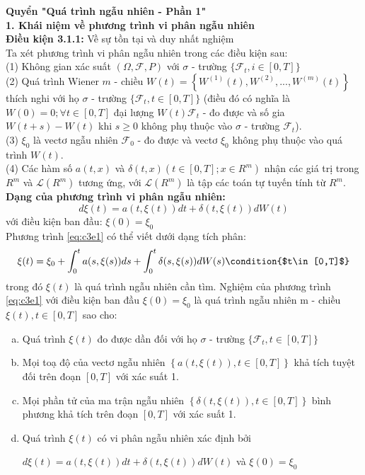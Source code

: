 \documentclass[12pt,a4paper]{article}
\begin{document}
\textbf{Quyển "Quá trình ngẫu nhiên - Phần 1"}\\
\textbf{1. Khái niệm về phương trình vi phân ngẫu nhiên}\\
\textbf{Điều kiện 3.1.1:} Về sự tồn tại và duy nhất nghiệm\\
Ta xét phương trình vi phân ngẫu nhiên trong các điều kiện sau:\\
(1) Không gian xác suất $(\Omega,\mathscr{F},P)$ với $\sigma$ - trường $\{\mathscr{F}_t,i\in [0,T]\}$\\
(2) Quá trình Wiener $m$ - chiều $W(t)=\left\{W^{(1)}(t),W^{(2)},...,W^{(m)}(t) \right\}$ thích nghi với họ $\sigma$ - trường $\{\mathscr{F}_t,t\in [0,T] \}$ (điều đó có nghĩa là $W(0)=0;\forall t\in[0,T]$ đại lượng $W(t)\mathscr{F}_t$ - đo được và số gia $W(t+s)-W(t)$ khi $s\geq0$ không phụ thuộc vào $\sigma$ - trường $\mathscr{F}_t$).\\
(3) $\xi_0$ là vectơ ngẫu nhiên $\mathscr{F}_0$ - đo được và vectơ $\xi_0$ không phụ thuộc vào quá trình $W(t)$.\\
(4) Các hàm số $a(t,x)$ và $\delta(t,x)\left(t\in [0,T];x\in R^m \right)$ nhận các giá trị trong $R^m$ và $\mathscr{L}(R^m)$ tương ứng, với $\mathscr{L}(R^m)$ là tập các toán tự tuyến tính từ $R^m$.\\
\textbf{Dạng của phương trình vi phân ngẫu nhiên:}\\
\begin{equation}\label{eq:c3e1}
	d\xi(t)=a(t,\xi(t))dt+\delta(t,\xi(t))dW(t)
\end{equation}
với điều kiện ban đầu: $\xi(0)=\xi_0$\\
Phương trình \eqref{eq:c3e1} có thể viết dưới dạng tích phân:
\begin{equation*}
	\xi(t)=\xi_0+\int_{0}^{t}a(s,\xi(s))ds+\int_{0}^{t}\delta(s,\xi(s))dW(s) \condition{$t\in[0,T]$}
\end{equation*}
trong đó $\xi(t)$ là quá trình ngẫu nhiên cần tìm. Nghiệm của phương trình \eqref{eq:c3e1} với điều kiện ban đầu $\xi(0)=\xi_0$ là quá trình ngẫu nhiên m - chiều $\xi(t),t\in[0,T]$ sao cho:\\
\begin{enumerate}[a)]
	\item Quá trình $\xi(t)$ đo được dần đối với họ $\sigma$ - trường $\{\mathscr{F}_t,t\in[0,T]\}$
	\item Mọi toạ độ của vectơ ngẫu nhiên $\left\{a(t,\xi(t)),t\in[0,T] \right\}$ khả tích tuyệt đối trên đoạn $[0,T]$ với xác suất 1.
	\item Mọi phần tử của ma trận ngẫu nhiên $\left\{\delta(t,\xi(t)),t\in[0,T] \right\}$ bình phương khả tích trên đoạn $[0,T]$ với xác suất 1.
	\item Quá trình $\xi(t)$ có vi phân ngẫu nhiên xác định bởi 
\begin{center}
	$d\xi(t)=a(t,\xi(t))dt+\delta(t,\xi(t))dW(t)$ và $\xi(0)=\xi_0$
\end{center}
\end{enumerate}
\end{document}
